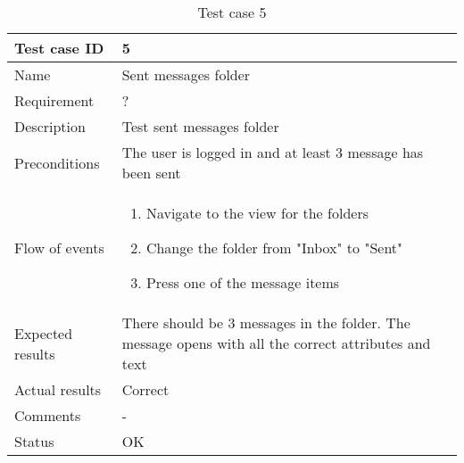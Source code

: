 		\begin{table}[htb]
			\begin{tabular}{l|p{10cm}}
				Test case ID & 5 \\ \hline
				Name & Sent messages folder\\ \hline
				Requirement & ?\\ \hline
				Description & Test sent messages folder\\ \hline
				Preconditions & The user is logged in and at least 3 message has been sent\\ \hline
				Flow of events & 
					\begin{enumerate}
						\item{}Navigate to the view for the folders
						\item{}Change the folder from "Inbox" to "Sent"
						\item{}Press one of the message items
					\end{enumerate} \\ \hline
				Expected results & There should be 3 messages in the folder. The message opens with all the correct 							attributes and text\\ \hline
				Actual results & Correct\\ \hline
				Comments &-\\ \hline
				Status &OK \\ \hline
			\end{tabular}
			\caption{Test case 5} \label{tab:case5}
		\end{table}

